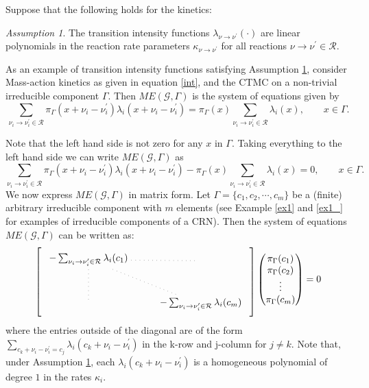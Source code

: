 \documentclass{amsart}
\theoremstyle{definition}
\theoremstyle{remark}
\theoremstyle{Conjecture/open problem}
\theoremstyle{assumption}
\newtheorem{assumption}{Assumption}
\theoremstyle{conjecture}
\def\la{\lambda}
\def\Ga{\Gamma}
\def\la{\lambda}
\def\p{^{\prime}}
\def\k{\kappa}
\def\cG{\mathcal{G}}
\def\cR{\mathcal{R}}
\numberwithin{equation}{section}
\begin{document}
Suppose that the following holds for the kinetics:
\begin{assumption}\label{ass1}
The transition intensity functions $\la_{\nu \to \nu\p}(\cdot)$ are linear polynomials in the reaction rate parameters $\k_{\nu \to \nu\p}$ for all reactions $\nu \to \nu\p\in\cR$. 
\end{assumption}
As an example of transition intensity functions satisfying Assumption \ref{ass1}, consider Mass-action kinetics as given in equation \eqref{int}, and the CTMC on a non-trivial irreducible component $\Ga$.
Then $ME(\cG,\Ga)$ is the system of equations given by
$$
  \sum_{\nu_i\to\nu_i\p\in\cR} \pi_\Ga(x+\nu_i-\nu_i\p)\la_i(x+\nu_i -\nu_i\p)=\pi_\Ga(x)\sum_{\nu_i\to\nu_i\p\in\cR}\la_i(x) ,\qquad x\in \Gamma .
$$

Note that the left hand side is not zero for any $x$ in $\Ga$. Taking everything to the left hand side we can write $ME(\cG,\Ga)$ as
$$\sum_{\nu_i\to\nu_i\p\in\cR} \pi_\Ga(x+\nu_i-\nu_i\p)\la_i(x+\nu_i -\nu_i\p)-\pi_\Ga(x)\sum_{\nu_i\to\nu_i\p\in\cR}\la_i(x)=0,\qquad x\in \Gamma \mbox{.}$$
We now express $ME(\cG,\Ga)$ in matrix form. Let $\Ga=\{c_1,c_2,\cdots, c_m\}$ be a (finite) arbitrary irreducible component with $m$ elements (see Example \ref{ex1} and \ref{ex1_} for examples of irreducible components of a CRN).
Then the system of equations $ME(\cG,\Ga)$ can be written as:\hfill\break
\begin{equation}
\begin{tikzpicture}[baseline=(current bounding box.center)]
\matrix (m) [matrix of math nodes,nodes in empty cells,right delimiter={]},left delimiter={[} ]{
-\sum_{\nu_i\to\nu_i\p\in\cR}\la_i(c_1)  &  &   &  &  &   \\
  & & & & &  \\
 & & & & &    \\
   & & & & &   \\
  & & & & &  \\
 & & &  &  & -\sum_{\nu_i\to\nu_i\p\in\cR}\la_i(c_m)\\
} ;
\draw[loosely dotted] (m-1-1)-- (m-6-6);
\draw[loosely dotted] (m-1-1)-- (m-1-6);
\draw[loosely dotted] (m-1-1)-- (m-6-1);
\end{tikzpicture} 
\begin{pmatrix}
    \pi_\Ga(c_1)\\\pi_\Ga(c_2)\\\vdots\\\pi_\Ga(c_m)
\end{pmatrix}=0
\label{eq:eqq1}
\end{equation}
where the entries outside of the diagonal are of the form $\sum_{c_k+\nu_i -\nu_i\p=c_j}\la_i(c_k+\nu_i -\nu_i\p)$ in the k-row and j-column for $j\neq k$. Note that, under Assumption \ref{ass1}, each $\la_i(c_k+\nu_i -\nu_i\p)$ is a homogeneous polynomial of degree $1$ in the rates $\k_i$.
\end{document}
